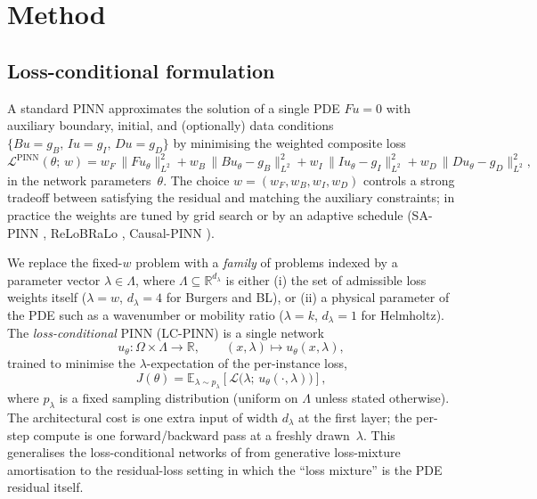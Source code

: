 \section{Method}
\label{sec:method}

\subsection{Loss-conditional formulation}

A standard PINN \citep{raissi2019} approximates the solution of a
single PDE $F u = 0$ with auxiliary boundary, initial, and (optionally)
data conditions $\{B u = g_B,\, I u = g_I,\, D u = g_D\}$ by minimising
the weighted composite loss
\begin{equation}
   \mathcal{L}^{\mathrm{PINN}}(\theta;\, w) =
     w_F \,\| F u_\theta \|_{L^2}^2 +
     w_B \,\| B u_\theta - g_B \|_{L^2}^2 +
     w_I \,\| I u_\theta - g_I \|_{L^2}^2 +
     w_D \,\| D u_\theta - g_D \|_{L^2}^2 ,
\label{eq:standard-pinn}
\end{equation}
in the network parameters~$\theta$. The choice
$w = (w_F, w_B, w_I, w_D)$ controls a strong tradeoff between
satisfying the residual and matching the auxiliary constraints; in
practice the weights are tuned by grid search or by an adaptive
schedule (SA-PINN \citep{mcclenny2020}, ReLoBRaLo \citep{bischof2021},
Causal-PINN \citep{wang2024}).

We replace the fixed-$w$ problem with a \emph{family} of problems
indexed by a parameter vector $\lambda \in \Lambda$, where
$\Lambda \subseteq \mathbb{R}^{d_\lambda}$ is either (i) the set of
admissible loss weights itself
($\lambda = w$, $d_\lambda = 4$ for Burgers and BL), or (ii) a
physical parameter of the PDE such as a wavenumber or mobility ratio
($\lambda = k$, $d_\lambda = 1$ for Helmholtz). The
\emph{loss-conditional} PINN (LC-PINN) is a single network
\begin{equation}
   u_\theta : \Omega \times \Lambda \to \mathbb{R},
\qquad
   (x, \lambda) \mapsto u_\theta(x, \lambda),
\label{eq:lc-network}
\end{equation}
trained to minimise the $\lambda$-expectation of the per-instance loss,
\begin{equation}
   J(\theta) = \mathbb{E}_{\lambda \sim p_\lambda}\!\left[
       \mathcal{L}\bigl(\lambda;\, u_\theta(\cdot, \lambda)\bigr)
   \right] ,
\label{eq:lc-objective}
\end{equation}
where $p_\lambda$ is a fixed sampling distribution (uniform on
$\Lambda$ unless stated otherwise). The architectural cost is one
extra input of width $d_\lambda$ at the first layer; the per-step
compute is one forward/backward pass at a freshly drawn~$\lambda$.
This generalises the loss-conditional networks of
\citet{dosovitskiy2020} from generative loss-mixture amortisation
to the residual-loss setting in which the ``loss mixture'' is the
PDE residual itself.

